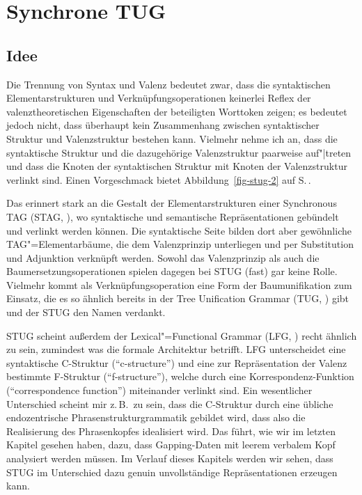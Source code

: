 \section{Synchrone TUG} \label{sec-stug-intro}

\subsection{Idee}

Die Trennung von Syntax und Valenz bedeutet zwar, dass die syntaktischen Elementarstrukturen und Verknüpfungsoperationen keinerlei Reflex der valenztheoretischen Eigenschaften der beteiligten Worttoken zeigen; es bedeutet jedoch nicht, dass überhaupt kein Zusammenhang zwischen syntaktischer Struktur und Valenzstruktur bestehen kann. Vielmehr nehme ich an, dass die syntaktische Struktur und die dazugehörige Valenzstruktur paarweise auf"|treten und dass die Knoten der syntaktischen Struktur mit Knoten der Valenzstruktur verlinkt sind. Einen Vorgeschmack bietet Abbildung~\ref{fig-stug-2} auf S.\,\pageref{fig-stug-2}.  

Das erinnert stark an die Gestalt der Elementarstrukturen einer Synchronous TAG (STAG, \citealt{Shieber:Schabes:90,Shieber:94,Nesson:Shieber:08}), wo syntaktische und semantische Repräsentationen gebündelt und verlinkt werden können. Die syntaktische Seite bilden dort aber gewöhnliche TAG"=Elementarbäume, die dem Valenzprinzip unterliegen und per Substitution und Adjunktion verknüpft werden. Sowohl das Valenzprinzip als auch die Baumersetzungsoperationen spielen dagegen bei STUG (fast) gar keine Rolle. Vielmehr kommt als Verknüpfungsoperation eine Form der Baumunifikation zum Einsatz, die es so ähnlich bereits in der Tree Unification Grammar (TUG, \citealt{Popowich:89,Gerdes:04}) gibt und der STUG den Namen verdankt.

STUG scheint außerdem der Lexical"=Functional Grammar (LFG, \citealt{Kaplan:Bresnan:82,Dalrymple:01,Asudeh:Toivonen:09}) recht ähnlich zu sein, zumindest was die formale Architektur betrifft. LFG unterscheidet eine syntaktische C-Struktur ("`c-structure"') und eine zur Repräsentation der Valenz bestimmte F-Struktur ("`f-structure"'), welche durch eine Korrespondenz-Funktion ("`correspondence function"') miteinander verlinkt sind. Ein wesentlicher Unterschied scheint mir z.\,B.\ zu sein, dass die C-Struktur durch eine übliche endozentrische Phrasenstrukturgrammatik gebildet wird, dass also die Realisierung des Phrasenkopfes idealisiert wird. Das führt, wie wir im letzten Kapitel gesehen haben, dazu, dass Gapping-Daten mit leerem verbalem Kopf analysiert werden müssen. Im Verlauf dieses Kapitels werden wir sehen, dass STUG im Unterschied dazu genuin unvollständige Repräsentationen erzeugen kann.


